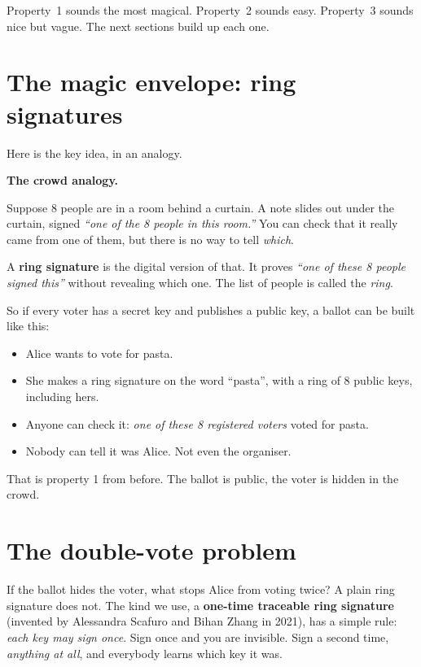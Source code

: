 \documentclass[11pt,a4paper]{article}
\newenvironment{aside}[1][Aside]{%
  \def\FrameCommand{\fboxsep=8pt\fcolorbox{boxrule}{boxbg}}%
  \MakeFramed{\advance\hsize-2\fboxsep\FrameRestore}%
  \noindent\textbf{#1.}\par\smallskip%
}{\endMakeFramed}
\begin{document}
Property~1 sounds the most magical. Property~2 sounds easy. Property~3
sounds nice but vague. The next sections build up each one.

\section{The magic envelope: ring signatures}

Here is the key idea, in an analogy.

\begin{aside}[The crowd analogy]
Suppose 8 people are in a room behind a curtain. A note slides out under
the curtain, signed \emph{``one of the 8 people in this room.''} You can
check that it really came from one of them, but there is no way to tell
\emph{which}.

A \textbf{ring signature} is the digital version of that. It proves
\emph{``one of these 8 people signed this''} without revealing which one.
The list of people is called the \emph{ring}.
\end{aside}

So if every voter has a secret key and publishes a public key, a ballot
can be built like this:

\begin{itemize}[leftmargin=*]
  \item Alice wants to vote for pasta.
  \item She makes a ring signature on the word ``pasta'', with a ring of
        8 public keys, including hers.
  \item Anyone can check it: \emph{one of these 8 registered voters}
        voted for pasta.
  \item Nobody can tell it was Alice. Not even the organiser.
\end{itemize}

That is property 1 from before. The ballot is public, the voter is hidden
in the crowd.

\section{The double-vote problem}

If the ballot hides the voter, what stops Alice from voting twice? A plain
ring signature does not. The kind we use, a \textbf{one-time traceable ring
signature} (invented by Alessandra Scafuro and Bihan Zhang in 2021), has a
simple rule: \emph{each key may sign once}. Sign once and you are invisible.
Sign a second time, \emph{anything at all}, and everybody learns which key
it was.
\end{document}
